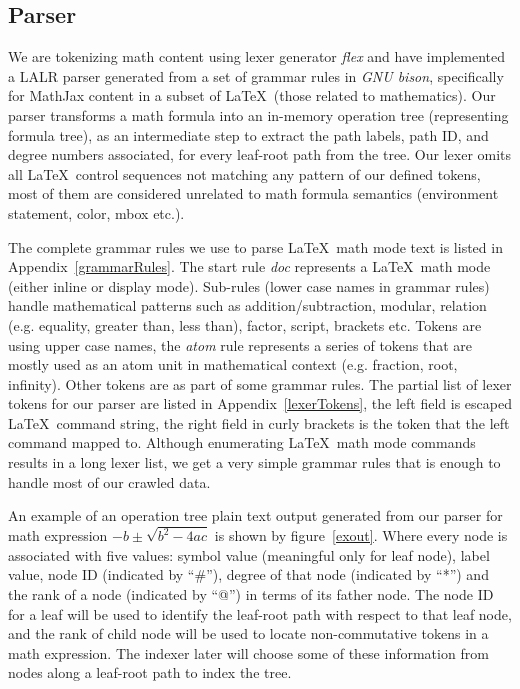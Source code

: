 \subsection{Parser}
We are tokenizing math content using lexer generator \textit{flex} and have implemented a LALR parser generated from a set of grammar rules in \textit{GNU bison}, specifically for MathJax content in a subset of \LaTeX\ (those related to mathematics).
Our parser transforms a math formula into an in-memory operation tree (representing formula tree), as an intermediate step to extract the path labels, path ID, and degree numbers associated, for every leaf-root path from the tree. 
Our lexer omits all \LaTeX\ control sequences not matching any pattern of our defined tokens, most of them are considered unrelated to math formula semantics (environment statement, color, mbox etc.).

The complete grammar rules we use to parse \LaTeX\ math mode text is listed in Appendix~\ref{grammarRules}. 
The start rule \textit{doc} represents a \LaTeX\ math mode (either inline or display mode).
Sub-rules (lower case names in grammar rules) handle mathematical patterns such as addition/subtraction, modular, relation (e.g. equality, greater than, less than), factor, script, brackets etc. 
Tokens are using upper case names, the \textit{atom} rule represents a series of tokens that are mostly used as an atom unit in mathematical context (e.g. fraction, root, infinity). Other tokens are as part of some grammar rules.
The partial list of lexer tokens for our parser are listed in Appendix~\ref{lexerTokens}, the left field is escaped \LaTeX\ command string, the right field in curly brackets is the token that the left command mapped to.
Although enumerating \LaTeX\ math mode commands results in a long lexer list, we get a very simple grammar rules that is enough to handle most of our crawled data.

An example of an operation tree plain text output generated from our parser for math expression 
$ -b \pm \sqrt{b^2 - 4ac}$ is shown by figure~\ref{exout}.
Where every node is associated with five values: symbol value (meaningful only for leaf node), label value, node ID (indicated by ``\#''), degree of that node (indicated by ``*'') and the rank of a node (indicated by ``@'') in terms of its father node.
The node ID for a leaf will be used to identify the leaf-root path with respect to that leaf node, and the rank of child node will be used to locate non-commutative tokens in a math expression.
The indexer later will choose some of these information from nodes along a leaf-root path to index the tree.

